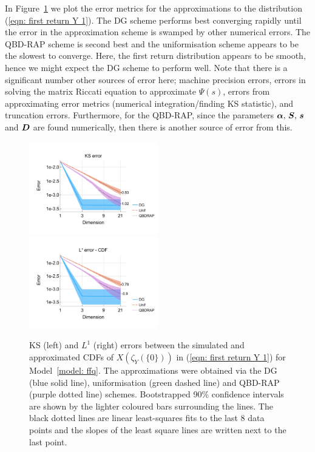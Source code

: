 In Figure~\ref{fig: ffq return cts} we plot the error metrics for the approximations to the distribution (\ref{eqn: first return Y 1}). The DG scheme performs best converging rapidly until the error in the approximation scheme is swamped by other numerical errors. The QBD-RAP scheme is second best and the uniformisation scheme appears to be the slowest to converge. Here, the first return distribution appears to be smooth, hence we might expect the DG scheme to perform well. Note that there is a significant number other sources of error here; machine precision errors, errors in solving the matrix Riccati equation to approximate \(\mathbb \Psi(s)\), errors from approximating error metrics (numerical integration/finding KS statistic), and truncation errors. Furthermore, for the QBD-RAP, since the parameters \(\boldsymbol \alpha,\,\boldsymbol S,\,\boldsymbol s\,\) and \(\boldsymbol D\) are found numerically, then there is another source of error from this. 
\begin{figure}[h]
	\centering
	\includegraphics[width=0.5\textwidth,trim={0.75cm 0.8cm 0.25cm 1.25cm},clip]{chapter6/figs/ffq/cts/ks_error_formatted.pdf}%
	\includegraphics[width=0.5\textwidth,trim={0.75cm 0.8cm 0.25cm 1.25cm},clip]{chapter6/figs/ffq/cts/l1_cdf_error_formatted.pdf}
	\caption{KS (left) and \(L^1\) (right) errors between the simulated and approximated CDFs of \(X(\zeta_{Y}(\{0\}))\) in (\ref{eqn: first return Y 1}) for Model~\ref{model: ffq}. The approximations were obtained via the DG (blue solid line), uniformisation (green dashed line) and QBD-RAP (purple dotted line) schemes. Bootstrapped 90\% confidence intervals are shown by the lighter coloured bars surrounding the lines. The black dotted lines are linear least-squares fits to the last 8 data points and the slopes of the least square lines are written next to the last point.} 
	\label{fig: ffq return cts} 
\end{figure}
